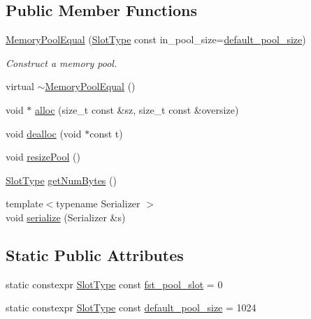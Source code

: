 \subsection*{Public Member Functions}
\begin{DoxyCompactItemize}
\item 
\hyperlink{structvt_1_1pool_1_1_memory_pool_equal_ad1f64e3c3c70d8c037c592f96443d02a}{Memory\+Pool\+Equal} (\hyperlink{structvt_1_1pool_1_1_memory_pool_equal_af05a2c24c95c666b20e3758745be746b}{Slot\+Type} const in\+\_\+pool\+\_\+size=\hyperlink{structvt_1_1pool_1_1_memory_pool_equal_a8daca02e94e9ab587670808525561c71}{default\+\_\+pool\+\_\+size})
\begin{DoxyCompactList}\small\item\em Construct a memory pool. \end{DoxyCompactList}\item 
virtual \hyperlink{structvt_1_1pool_1_1_memory_pool_equal_aa6f87becb85f4fc575b2d5dcd68d89af}{$\sim$\+Memory\+Pool\+Equal} ()
\item 
void $\ast$ \hyperlink{structvt_1_1pool_1_1_memory_pool_equal_a727cf3e178072758dee1938fb6d1034a}{alloc} (size\+\_\+t const \&sz, size\+\_\+t const \&oversize)
\item 
void \hyperlink{structvt_1_1pool_1_1_memory_pool_equal_ac0ba1070721db874f2a80280b8f94b1e}{dealloc} (void $\ast$const t)
\item 
void \hyperlink{structvt_1_1pool_1_1_memory_pool_equal_a42ba3ac19921517b82c4e6ff4cba6b80}{resize\+Pool} ()
\item 
\hyperlink{structvt_1_1pool_1_1_memory_pool_equal_af05a2c24c95c666b20e3758745be746b}{Slot\+Type} \hyperlink{structvt_1_1pool_1_1_memory_pool_equal_a222efeb2d8fee03b4fb8c275f9cfa1ac}{get\+Num\+Bytes} ()
\item 
{\footnotesize template$<$typename Serializer $>$ }\\void \hyperlink{structvt_1_1pool_1_1_memory_pool_equal_a49e3617769cd0bdcb3957b93466595a3}{serialize} (Serializer \&s)
\end{DoxyCompactItemize}
\subsection*{Static Public Attributes}
\begin{DoxyCompactItemize}
\item 
static constexpr \hyperlink{structvt_1_1pool_1_1_memory_pool_equal_af05a2c24c95c666b20e3758745be746b}{Slot\+Type} const \hyperlink{structvt_1_1pool_1_1_memory_pool_equal_a11e4d0dbd2ea5c1f93fa8cdf36c1e60a}{fst\+\_\+pool\+\_\+slot} = 0
\item 
static constexpr \hyperlink{structvt_1_1pool_1_1_memory_pool_equal_af05a2c24c95c666b20e3758745be746b}{Slot\+Type} const \hyperlink{structvt_1_1pool_1_1_memory_pool_equal_a8daca02e94e9ab587670808525561c71}{default\+\_\+pool\+\_\+size} = 1024
\end{DoxyCompactItemize}
